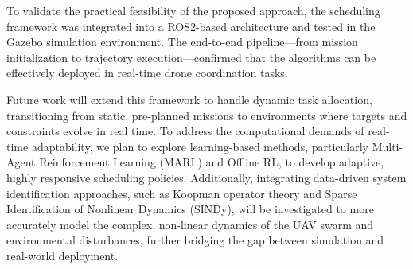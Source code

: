 \documentclass[subscriptcorrection,upint,nolists, varvw,barcolor=Goldenrod3,mathalfa=cal=euler,balance,hyphenate,french]{asmejour} %
\begin{document}
To validate the practical feasibility of the proposed approach, the scheduling framework was integrated into a ROS2-based architecture and tested in the Gazebo simulation environment. 
The end-to-end pipeline—from mission initialization to trajectory execution—confirmed that the algorithms can be effectively deployed in real-time drone coordination tasks.

Future work will extend this framework to handle dynamic task allocation, transitioning from static, pre-planned missions to environments where targets and constraints evolve in real time. 
To address the computational demands of real-time adaptability, we plan to explore learning-based methods, particularly Multi-Agent Reinforcement Learning (MARL) and Offline RL, to develop adaptive, highly responsive scheduling policies.
Additionally, integrating data-driven system identification approaches, such as Koopman operator theory and Sparse Identification of Nonlinear Dynamics (SINDy), will be investigated to more accurately model the complex, non-linear dynamics of the UAV swarm and environmental disturbances, further bridging the gap between simulation and real-world deployment.




\end{document}
